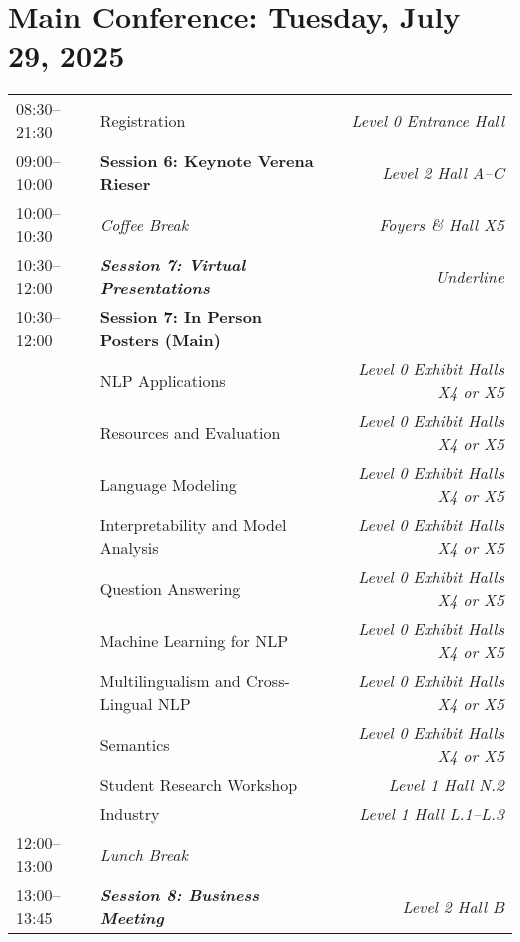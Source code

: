 \clearpage


\section{Main Conference: Tuesday, July 29, 2025}

\begin{xltabular}{\linewidth}{l X r}
    08:30--21:30    &   Registration    &   \textit{Level 0 Entrance Hall} \\
    
    09:00--10:00    &   \textbf{Session 6: Keynote Verena Rieser}    &   \textit{Level 2 Hall A--C} \\
    
    10:00--10:30    &   \textit{Coffee Break}    & \textit{Foyers \& Hall X5}  \\
    
    10:30--12:00    &   \textit{\textbf{Session 7: Virtual Presentations}}    & \textit{Underline}  \\
    10:30--12:00    &   \textbf{Session 7: In Person Posters (Main)} & \\
    &   NLP Applications  & \textit{Level 0 Exhibit Halls X4 or X5} \\
    &   Resources and Evaluation  & \textit{Level 0 Exhibit Halls X4 or X5} \\
    &   Language Modeling  & \textit{Level 0 Exhibit Halls X4 or X5} \\
    &   Interpretability and Model Analysis   & \textit{Level 0 Exhibit Halls X4 or X5} \\
    &   Question Answering  & \textit{Level 0 Exhibit Halls X4 or X5} \\
    &   Machine Learning for NLP  & \textit{Level 0 Exhibit Halls X4 or X5} \\
    &   Multilingualism and Cross-Lingual NLP  & \textit{Level 0 Exhibit Halls X4 or X5} \\
    &   Semantics  & \textit{Level 0 Exhibit Halls X4 or X5} \\
    &   Student Research Workshop  & \textit{Level 1 Hall N.2} \\
    &   Industry  & \textit{Level 1 Hall L.1--L.3} \\

    12:00--13:00    &   \textit{Lunch Break}  & \\

    13:00--13:45    &   \textit{\textbf{Session 8: Business Meeting}}  & \textit{Level 2 Hall B}\\


\end{xltabular}
